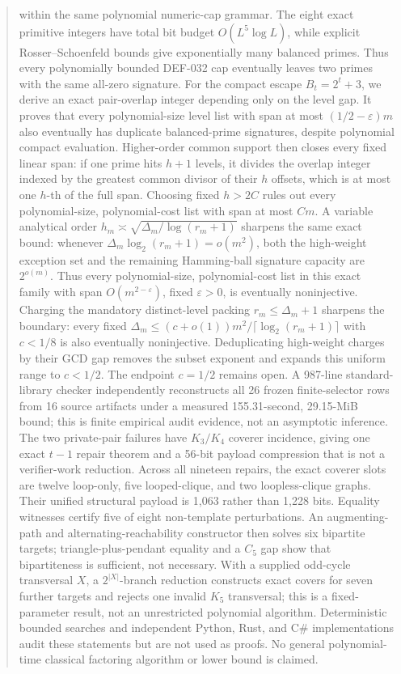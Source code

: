 \documentclass[11pt]{article}
\begin{document}
\begin{abstract}
within the same polynomial numeric-cap grammar. The eight exact primitive
integers have total bit budget \(O(L^5\log L)\), while explicit
Rosser--Schoenfeld bounds give exponentially many balanced primes. Thus every
polynomially bounded DEF-032 cap eventually leaves two primes with the same
all-zero signature.
For the compact escape \(B_t=2^t+3\), we derive an exact pair-overlap integer
depending only on the level gap. It proves that every polynomial-size level
list with span at most \((1/2-\varepsilon)m\) also eventually has duplicate
balanced-prime signatures, despite polynomial compact evaluation.
Higher-order common support then closes every fixed linear span: if one prime
hits \(h+1\) levels, it divides the overlap integer indexed by the greatest
common divisor of their \(h\) offsets, which is at most one \(h\)-th of the
full span. Choosing fixed \(h>2C\) rules out every polynomial-size,
polynomial-cost list with span at most \(Cm\).
A variable analytical order
\(h_m\asymp\sqrt{\Delta_m/\log(r_m+1)}\) sharpens the same exact bound:
whenever \(\Delta_m\log_2(r_m+1)=o(m^2)\), both the high-weight exception
set and the remaining Hamming-ball signature capacity are \(2^{o(m)}\).
Thus every polynomial-size, polynomial-cost list in this exact family with
span \(O(m^{2-\varepsilon})\), fixed \(\varepsilon>0\), is eventually
noninjective. Charging the mandatory distinct-level packing
\(r_m\le\Delta_m+1\) sharpens the boundary: every fixed
\(\Delta_m\le(c+o(1))m^2/\lceil\log_2(r_m+1)\rceil\) with \(c<1/8\)
is also eventually noninjective. Deduplicating high-weight charges by their
GCD gap removes the subset exponent and expands this uniform range to
\(c<1/2\). The endpoint \(c=1/2\) remains open.
A 987-line standard-library checker independently reconstructs all 26 frozen
finite-selector rows from 16 source artifacts under a measured
155.31-second, 29.15-MiB bound; this is finite empirical audit evidence, not
an asymptotic inference. The two private-pair failures have \(K_3/K_4\)
coverer incidence, giving one exact \(t-1\) repair theorem and a 56-bit
payload compression that is not a verifier-work reduction. Across all
nineteen repairs, the exact coverer slots are twelve loop-only, five
looped-clique, and two loopless-clique graphs. Their unified structural
payload is 1,063 rather than 1,228 bits. Equality witnesses certify five of
eight non-template perturbations. An augmenting-path and
alternating-reachability constructor then solves six bipartite targets;
triangle-plus-pendant equality and a \(C_5\) gap show that bipartiteness is
sufficient, not necessary. With a supplied odd-cycle transversal \(X\), a
\(2^{|X|}\)-branch reduction constructs exact covers for seven further
targets and rejects one invalid \(K_5\) transversal; this is a
fixed-parameter result, not an unrestricted polynomial algorithm.
Deterministic
bounded searches and independent
Python, Rust, and C\# implementations audit these statements but are not used
as proofs. No general polynomial-time classical factoring algorithm or lower
bound is claimed.
\end{abstract}
\end{document}
